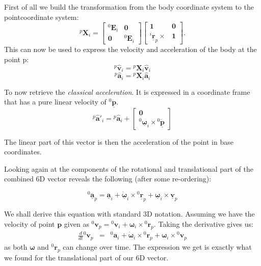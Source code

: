 \documentclass[a4paper]{article}
\newcommand{\Spa}[1]{\mathbf{\hat{#1}}}
\newcommand{\Nspa}[1]{\mathbf{\underline{#1}}}
\newcommand{\Vec}[1]{\mathbf{#1}}
\begin{document}
First of all we build the transformation from the body coordinate system to
the pointcoordinate system:
\begin{equation}
	{^p}\Vec{X}_i =
	\left[
	\begin{array}{cc}
		{^0}\Vec{E}_i & \Vec{0} \\
		\Vec{0} & {^0}\Vec{E}_i
	\end{array}
	\right]
	\left[
	\begin{array}{cc}
		\Vec{1} & \Vec{0} \\
		{^i}\Nspa{r}_p \times & \Vec{1}
	\end{array}
	\right].
\end{equation}
This can now be used to express the velocity and acceleration of the body at
the point p:
\begin{equation}
	{^p}\Spa{v}_i = {^p}\Vec{X}_i \Spa{v}_i
\end{equation}
\begin{equation}
	{^p}\Spa{a}_i = {^p}\Vec{X}_i \Spa{a}_i
\end{equation}

To now retrieve the \emph{classical acceleration}. It is expressed in a
coordinate frame that has a pure linear velocity of ${^0}\Nspa{\dot{p}}$.
\begin{equation}
	{^p}\Spa{a}'_i = {^p}\Spa{a}_i + 
	\left[
	\begin{array}{c}
		\Vec{0}\\
		{^0}\Nspa{\omega}_i \times {^0}\Nspa{\dot{p}}
	\end{array}
	\right]
\end{equation}

The linear part of this vector is then the acceleration of the point in base
coordinates.

Looking again at the components of the rotational and translational part of
the combined 6D vector reveals the following (after some re-ordering):

\begin{equation}
	{}^0\Nspa{a}_p = \Nspa{a}_i +
	\Nspa{\dot{\omega}}_i
	\times
	{}^0\Nspa{r}_p
	+
	\Nspa{\omega}_i \times \Nspa{v}_p
	\label{}
\end{equation}

We shall derive this equation with standard 3D notation. Assuming we have the
velocity of point $\Vec{p}$ given as ${}^0\Vec{v}_p = {}^0\Vec{v}_i +
\Vec{\omega}_i \times {}^0\Vec{r}_p$. Taking the derivative gives us:
\begin{eqnarray}
	\frac{d}{dt} {}^0 \Vec{v}_p & = & {}^0 \Vec{a}_i + \Vec{\dot{\omega}}_i \times
	{}^0 \Vec{r}_p + \Vec{\omega}_i \times {}^0 \Vec{ v}_p
	\label{}
\end{eqnarray}
as both $\Vec{\omega}$ and ${}^0\Vec{r}_p$ can change over time. The
expression we get is exactly what we found for the translational part of our
6D vector.
\end{document}

